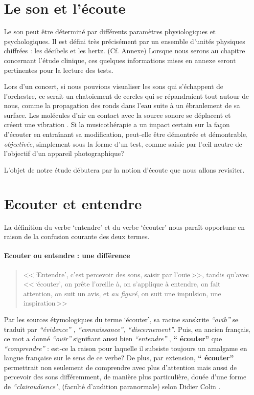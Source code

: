 
\section{Le son et l'écoute}



Le son peut être déterminé par différents paramètres
physiologiques et psychologiques.
Il est défini très précisément par un ensemble d'unités physiques chiffrées
: les décibels  et les hertz. (Cf. Annexe)
Lorsque nous serons au chapitre concernant l'étude clinique,
ces quelques informations mises en annexe seront pertinentes pour la lecture des tests.

Lors d'un concert, si nous pouvions visualiser les sons qui
s'échappent de l'orchestre, ce serait un chatoiement de cercles qui se
répandraient tout autour de nous, comme
la propagation des
ronds dans l'eau suite à un ébranlement de sa surface.
Les molécules d'air en contact avec la source sonore se déplacent et
créent une vibration \autocite[183]{bencivelli:pourquoi,}.
Si la
musicothérapie a un impact certain sur la façon d'écouter en
entraînant sa
modification, peut-elle être  démontrée et démontrable, \textsl{objectivée},
simplement sous la forme d'un test, comme saisie par
l'\oe il neutre de l'objectif d'un appareil
photographique?

L'objet de notre étude débutera par la notion d'écoute que nous allons revisiter.
\section{Ecouter et entendre}
La définition du verbe `entendre' et du verbe `écouter'
nous paraît opportune
en raison de la confusion courante des deux termes.
\paragraph{Ecouter ou entendre : une différence}
\begin{quote}<<\,`Entendre', c'est  percevoir des sons, saisir par l'ouïe\,>>, tandis qu'avec
<<\,`écouter', on prête l'oreille à, on s'applique à entendre, on fait attention, on suit un avis, et \emph{au figuré}, on suit une impulsion, une inspiration\,>> \autocite[361--385]{hachette:dictionnaire} \end{quote}
Par les sources étymologiques du
terme `écouter',
 sa racine sanskrite \emph{ ``avih'' } se traduit par
 \emph{``évidence'' , ``connaissance'', ``discernement''}. Puis, en ancien
 français, ce mot a donné \textit{``ouïr''} signifiant aussi bien \textit{``entendre''} ,
\textbf{`` écouter'' } que \textit{``comprendre''} \autocite {etymologieWeb}:
 est-ce la raison
pour laquelle il subsiste toujours un amalgame en langue française
sur le sens de ce verbe?
De plus, par extension, \textbf{`` écouter'' }
permettrait non seulement de comprendre avec plus d'attention
mais aussi de percevoir des sons différemment, de manière plus particulière, douée d'une forme de
\textit{``clairaudience"}, (faculté d'audition paranormale) selon Didier
Colin \autocite {colin2015}.

